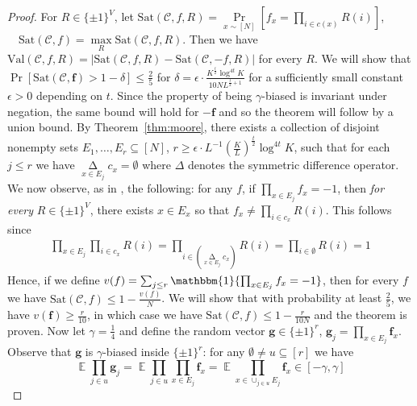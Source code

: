 \documentclass[11pt]{article}
\newcommand{\todo}[1]{\textcolor{red}{TODO: #1}}
\newcommand{\E}{\mathop{\mathbb{E}}}
\newcommand{\N}{[N]}
\begin{document}
\begin{proof}
For $R \in \{\pm 1\}^V$, let $
\mathrm{Sat}(\mathcal{C},f,R) = \Pr\limits_{x \sim \N}[f_x = \prod_{i \in c(x) }R(i)]$, $ \quad \mathrm{Sat}(\mathcal{C},f) = \max\limits_{R} \mathrm{Sat}(\mathcal{C},f,R)$.
Then we have $\mathrm{Val}(\mathcal{C},f,R) = |\mathrm{Sat}(\mathcal{C},f,R) - \mathrm{Sat}(\mathcal{C},-f,R)|$ for every $R$. We will show that $ \Pr[\mathrm{Sat}(\mathcal{C},\bm{f}) > 1-\delta ] \leq \frac{2}{5}$ for $\delta =  \epsilon \cdot \frac{K^{\frac{t}{2}}\log^{4t}K}{10N L^{\frac{t}{2}+1}}$ for a sufficiently small constant $\epsilon > 0$ depending on $t$. Since the property of being $\gamma$-biased is invariant under negation, the same bound will hold for $-\bm{f}$ and so the theorem will follow by a union bound.
By Theorem~\ref{thm:moore}, there exists a collection of disjoint nonempty sets $E_1,\ldots,E_r \subseteq \N$, $r \geq \epsilon \cdot L^{-1}(\frac{K}{L})^{\frac{t}{2}} \log^{4t}K$, such that for each $j \leq r$ we have $\mathop{\Delta}\limits_{x \in E_j} c_x = \emptyset$ where $\Delta$ denotes the symmetric difference operator.
We now observe, as in \cite{FKO,smoothed}, the following: for any $f$, if $\prod_{x \in E_j} f_x = -1$, then \emph{for every} $R \in \{\pm 1 \}^V$, there exists $x \in E_x$ so that $f_x \neq \prod_{i \in c_x} R(i)$. This follows since
\begin{gather*}
\prod_{x \in E_j} \prod_{i \in c_x} R(i) = \prod_{i \in (\mathop{\Delta}\limits_{x\in E_j}c_x)} R(i) = \prod_{i \in \emptyset} R(i) = 1
\end{gather*}
Hence, if we define $v(f) = \sum_{j \leq r} \mathbbm{1}\{\prod_{x \in E_j} f_x = -1\} $, then for every $f$ we have $\mathrm{Sat}(\mathcal{C},f) \leq 1 - \frac{v(f)}{N}$. We will show that with probability at least $\frac{2}{5}$, we have $v(\bm{f}) \geq \frac{r}{10}$, in which case we have $\mathrm{Sat}(\mathcal{C},f) \leq 1 - \frac{r}{10N}$ and the theorem is proven.
Now let $\gamma=  \frac{1}{4}$ and define the random vector $\bm{g} \in \{\pm 1\}^r$, $\bm{g}_j = \prod_{x \in E_j} \bm{f}_x$. Observe that $\bm{g}$ is $\gamma$-biased inside $\{\pm 1\}^r$: for any $\emptyset \neq u \subseteq [r]$ we have
\[
\E\prod_{j \in u} \bm{g}_j  = \E\prod_{j \in u}\prod_{x \in E_j} \bm{f}_x= \E\prod_{x \in \cup_{j\in u} E_j} \bm{f}_x \in [-\gamma,  \gamma]
\]
\end{proof}
\end{document}
